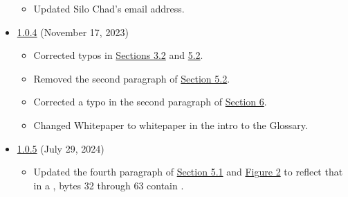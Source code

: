 \documentclass[class=article, crop=false]{standalone}
\begin{document}
\begin{itemize}[topsep=0pt, itemsep=3pt,leftmargin=16pt]
\begin{itemize}
        \item Updated Silo Chad's email address. 
    \end{itemize}
    \item \href{https://github.com/BeanstalkFarms/Pipeline-Whitepaper/blob/master/version-history/pipeline1_0_4.pdf}{1.0.4} (November 17, 2023)
    \begin{itemize}
        \item Corrected typos in \hyperlink{subsection.3.2}{Sections 3.2} and \hyperlink{subsection.5.2}{5.2}.
        \item Removed the second paragraph of \hyperlink{subsection.5.2}{Section 5.2}.
        \item Corrected a typo in the second paragraph of \hyperlink{section.6}{Section 6}.
        \item Changed Whitepaper to whitepaper in the intro to the Glossary.
    \end{itemize}
    \item \href{https://github.com/BeanstalkFarms/Pipeline-Whitepaper/blob/master/version-history/pipeline1_0_5.pdf}{1.0.5} (July 29, 2024)
    \begin{itemize}
        \item Updated the fourth paragraph of \hyperlink{subsection.5.1}{Section 5.1} and \hyperref[fig 2]{Figure 2} to reflect that in a   , bytes 32 through 63 contain .
    \end{itemize}
    
\end{itemize}
\end{document}
